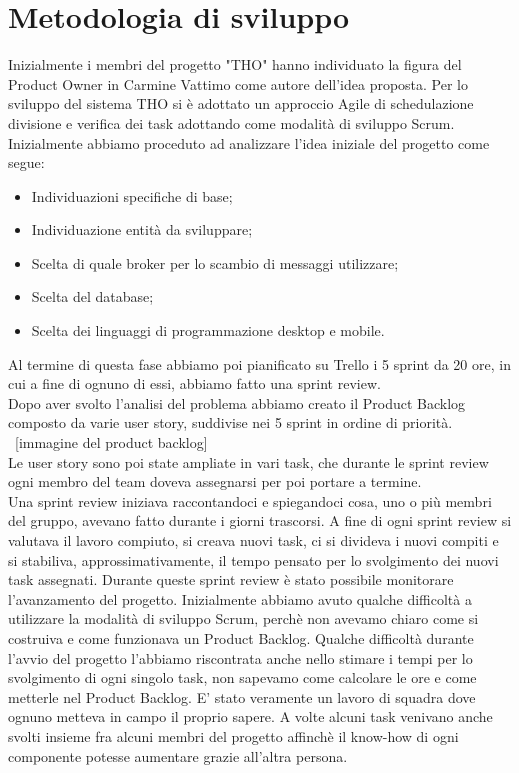 \documentclass[12pt, english]{report}
\begin{document}
\section{Metodologia di sviluppo}
Inizialmente i membri del progetto "THO" hanno individuato la figura del Product Owner in Carmine Vattimo come autore dell'idea proposta. Per lo sviluppo del sistema THO si è adottato un approccio Agile di schedulazione divisione e verifica dei task adottando come modalità di sviluppo Scrum. 
\\ Inizialmente abbiamo proceduto ad analizzare l'idea iniziale del progetto come segue:
\begin{itemize}
	\item Individuazioni specifiche di base;
	\item Individuazione entità da sviluppare;
	\item Scelta di quale broker per lo scambio di messaggi utilizzare;
	\item Scelta del database;
	\item Scelta dei linguaggi di programmazione desktop e mobile.
\end{itemize}

Al termine di questa fase abbiamo poi pianificato su Trello i 5 sprint da 20 ore, in cui a fine di ognuno di essi, abbiamo fatto una sprint review.\\Dopo aver svolto l'analisi del problema abbiamo creato il Product Backlog composto da varie user story, suddivise nei 5 sprint in ordine di priorità. \\

{\ [immagine del product backlog]}\\

Le user story sono poi state ampliate in vari task, che durante le sprint review ogni membro del team doveva assegnarsi per poi portare a termine. \\Una sprint review iniziava raccontandoci e spiegandoci cosa, uno o più membri del gruppo, avevano fatto durante i giorni trascorsi. A fine di ogni sprint review si valutava il lavoro compiuto, si creava nuovi task, ci si divideva i nuovi compiti e si stabiliva, approssimativamente, il tempo pensato per lo svolgimento dei nuovi task assegnati. Durante queste sprint review è stato possibile monitorare l'avanzamento del progetto. Inizialmente abbiamo avuto qualche difficoltà a utilizzare la modalità di sviluppo Scrum, perchè non avevamo chiaro come si costruiva e come funzionava un Product Backlog. Qualche difficoltà durante l'avvio del progetto l'abbiamo riscontrata anche nello stimare i tempi per lo svolgimento di ogni singolo task, non sapevamo come calcolare le ore e come metterle nel Product Backlog. E' stato veramente un lavoro di squadra dove ognuno metteva in campo il proprio sapere. A volte alcuni task venivano anche svolti insieme fra alcuni membri del progetto affinchè il know-how di ogni componente potesse aumentare grazie all'altra persona.
\end{document}
